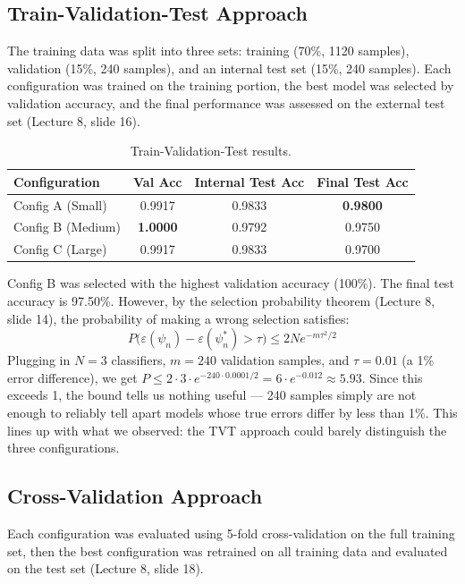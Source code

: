 \documentclass[11pt]{article}
\begin{document}
\subsection{Train-Validation-Test Approach}
The training data was split into three sets: training (70\%, 1120 samples), validation (15\%, 240 samples), and an internal test set (15\%, 240 samples). Each configuration was trained on the training portion, the best model was selected by validation accuracy, and the final performance was assessed on the external test set (Lecture 8, slide 16).

\begin{table}[H]
	\centering
	\caption{Train-Validation-Test results.}
	\begin{tabular}{lccc}
		\toprule
		Configuration     & Val Acc         & Internal Test Acc & Final Test Acc  \\
		\midrule
		Config A (Small)  & 0.9917          & 0.9833            & \textbf{0.9800} \\
		Config B (Medium) & \textbf{1.0000} & 0.9792            & 0.9750          \\
		Config C (Large)  & 0.9917          & 0.9833            & 0.9700          \\
		\bottomrule
	\end{tabular}
\end{table}

Config B was selected with the highest validation accuracy (100\%). The final test accuracy is 97.50\%. However, by the selection probability theorem (Lecture 8, slide 14), the probability of making a wrong selection satisfies:
$$P\big(\varepsilon(\psi_n) - \varepsilon(\psi_n^*) > \tau\big) \leq 2N e^{-m\tau^2/2}$$
Plugging in $N = 3$ classifiers, $m = 240$ validation samples, and $\tau = 0.01$ (a 1\% error difference), we get $P \leq 2 \cdot 3 \cdot e^{-240 \cdot 0.0001/2} = 6 \cdot e^{-0.012} \approx 5.93$. Since this exceeds 1, the bound tells us nothing useful --- 240 samples simply are not enough to reliably tell apart models whose true errors differ by less than 1\%. This lines up with what we observed: the TVT approach could barely distinguish the three configurations.

\subsection{Cross-Validation Approach}
Each configuration was evaluated using 5-fold cross-validation on the full training set, then the best configuration was retrained on all training data and evaluated on the test set (Lecture 8, slide 18).
\end{document}
